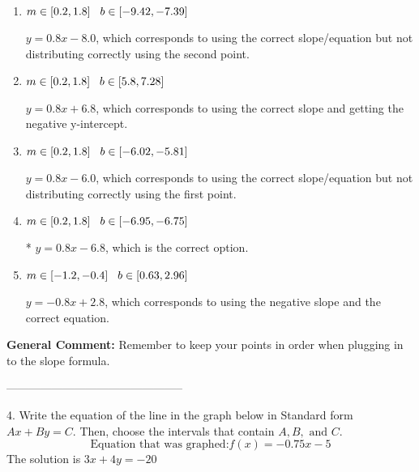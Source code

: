\documentclass{extbook}[14pt]
\begin{document}
\begin{enumerate}[label=\Alph*.] 
\item $ m \in [0.2, 1.8] \hspace*{3mm} b \in [-9.42, -7.39] $ 

  $y = 0.8x -8.0$, which corresponds to using the correct slope/equation but not distributing correctly using the second point. 
\item $ m \in [0.2, 1.8] \hspace*{3mm} b \in [5.8, 7.28] $ 

  $y = 0.8x + 6.8$, which corresponds to using the correct slope and getting the negative y-intercept. 
\item $ m \in [0.2, 1.8] \hspace*{3mm} b \in [-6.02, -5.81] $ 

  $y = 0.8x -6.0$, which corresponds to using the correct slope/equation but not distributing correctly using the first point. 
\item $ m \in [0.2, 1.8] \hspace*{3mm} b \in [-6.95, -6.75] $ 

 * $y = 0.8x -6.8$, which is the correct option. 
\item $ m \in [-1.2, -0.4] \hspace*{3mm} b \in [0.63, 2.96] $ 

  $y = -0.8x + 2.8$, which corresponds to using the negative slope and the correct equation. 
\end{enumerate} 
 
\textbf{General Comment:} Remember to keep your points in order when plugging in to the slope formula. 

-----------------------------------------------

4. Write the equation of the line in the graph below in Standard form $Ax+By=C$. Then, choose the intervals that contain $A, B, \text{ and } C$.
\[ \text{Equation that was graphed:} f(x)= -0.75x -5 \] 
The solution is $ 3x + 4y = -20 $ 
\end{document}
